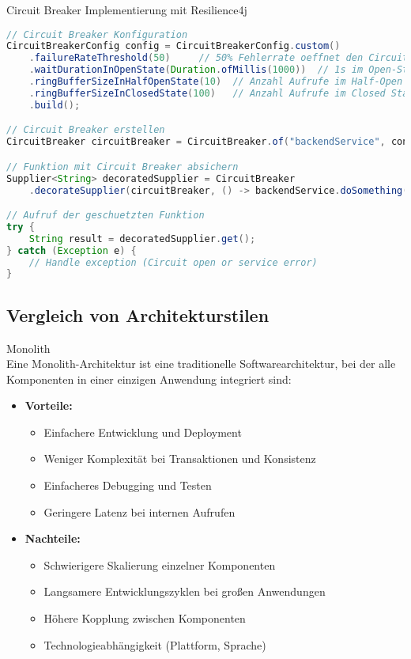 \begin{examplecode}{Circuit Breaker Implementierung mit Resilience4j}\\
\begin{lstlisting}[language=Java, style=basesmol]
// Circuit Breaker Konfiguration
CircuitBreakerConfig config = CircuitBreakerConfig.custom()
    .failureRateThreshold(50)     // 50% Fehlerrate oeffnet den Circuit Breaker
    .waitDurationInOpenState(Duration.ofMillis(1000))  // 1s im Open-State
    .ringBufferSizeInHalfOpenState(10)  // Anzahl Aufrufe im Half-Open State
    .ringBufferSizeInClosedState(100)   // Anzahl Aufrufe im Closed State
    .build();

// Circuit Breaker erstellen
CircuitBreaker circuitBreaker = CircuitBreaker.of("backendService", config);

// Funktion mit Circuit Breaker absichern
Supplier<String> decoratedSupplier = CircuitBreaker
    .decorateSupplier(circuitBreaker, () -> backendService.doSomething());

// Aufruf der geschuetzten Funktion
try {
    String result = decoratedSupplier.get();
} catch (Exception e) {
    // Handle exception (Circuit open or service error)
}
\end{lstlisting}
\end{examplecode}

\subsection{Vergleich von Architekturstilen}

\begin{concept}{Monolith}\\
    Eine Monolith-Architektur ist eine traditionelle Softwarearchitektur, bei der alle Komponenten in einer einzigen Anwendung integriert sind:
    \begin{itemize}
        \item \textbf{Vorteile:}
        \begin{itemize}
            \item Einfachere Entwicklung und Deployment
            \item Weniger Komplexität bei Transaktionen und Konsistenz
            \item Einfacheres Debugging und Testen
            \item Geringere Latenz bei internen Aufrufen
        \end{itemize}
        
        \item \textbf{Nachteile:}
        \begin{itemize}
            \item Schwierigere Skalierung einzelner Komponenten
            \item Langsamere Entwicklungszyklen bei großen Anwendungen
            \item Höhere Kopplung zwischen Komponenten
            \item Technologieabhängigkeit (Plattform, Sprache)
        \end{itemize}
    \end{itemize}
\end{concept}

